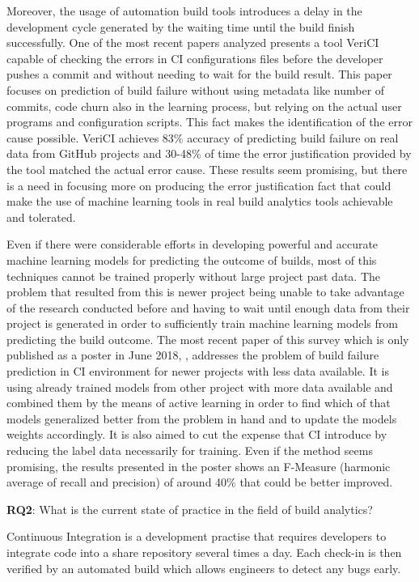 \documentclass[]{book}
\begin{document}
Moreover, the usage of automation build tools introduces a delay in the
development cycle generated by the waiting time until the build finish
successfully. One of the most recent papers analyzed
\citet{santolucito2018statically} presents a tool VeriCI capable of
checking the errors in CI configurations files before the developer
pushes a commit and without needing to wait for the build result. This
paper focuses on prediction of build failure without using metadata like
number of commits, code churn also in the learning process, but relying
on the actual user programs and configuration scripts. This fact makes
the identification of the error cause possible. VeriCI achieves 83\%
accuracy of predicting build failure on real data from GitHub projects
and 30-48\% of time the error justification provided by the tool matched
the actual error cause. These results seem promising, but there is a
need in focusing more on producing the error justification fact that
could make the use of machine learning tools in real build analytics
tools achievable and tolerated.

Even if there were considerable efforts in developing powerful and
accurate machine learning models for predicting the outcome of builds,
most of this techniques cannot be trained properly without large project
past data. The problem that resulted from this is newer project being
unable to take advantage of the research conducted before and having to
wait until enough data from their project is generated in order to
sufficiently train machine learning models from predicting the build
outcome. The most recent paper of this survey which is only published as
a poster in June 2018, \citet{ni2018acona}, addresses the problem of
build failure prediction in CI environment for newer projects with less
data available. It is using already trained models from other project
with more data available and combined them by the means of active
learning in order to find which of that models generalized better from
the problem in hand and to update the models weights accordingly. It is
also aimed to cut the expense that CI introduce by reducing the label
data necessarily for training. Even if the method seems promising, the
results presented in the poster shows an F-Measure (harmonic average of
recall and precision) of around 40\% that could be better improved.

\textbf{RQ2}: What is the current state of practice in the field of
build analytics?

Continuous Integration is a development practise that requires
developers to integrate code into a share repository several times a
day. Each check-in is then verified by an automated build which allows
engineers to detect any bugs early.
\end{document}
